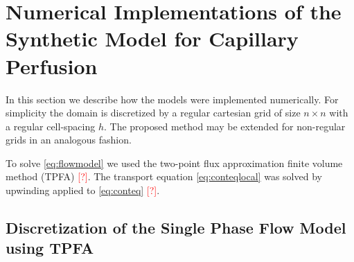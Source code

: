 \documentclass[paper=a4, fontsize=11pt,parskip=half,headings=small]{scrartcl}
\newcommand{\missingsource}{\textcolor{red}{[?]}}
\begin{document}
	\section{Numerical Implementations of the Synthetic Model for Capillary Perfusion}
	
	In this section we describe how the models were implemented numerically.
	For simplicity the domain is discretized by a regular cartesian grid of size $n \times n$ with a regular cell-spacing $h$.
	The proposed method may be extended for non-regular grids in an analogous fashion.	

	To solve \eqref{eq:flowmodel} we used the two-point flux approximation finite volume method (TPFA) \missingsource. 
	The transport equation \eqref{eq:conteqlocal} was solved by upwinding applied to \eqref{eq:conteq} \missingsource.

	\subsection{Discretization of the Single Phase Flow Model using TPFA} \label{sec:numflow}
\end{document}
